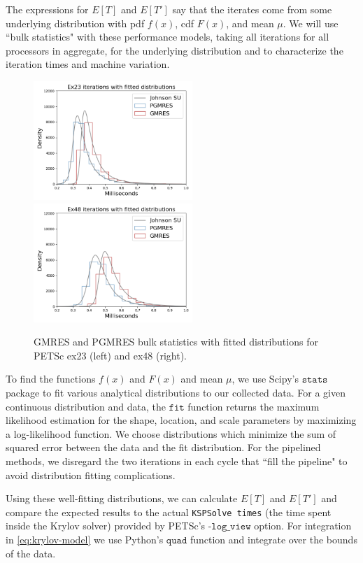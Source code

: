 \documentclass[sigconf]{acmart}
\begin{document}
The expressions for $E[T]$ and $E[T']$ say that the iterates come from some underlying  distribution with pdf $f(x)$, cdf $F(x)$, and mean $\mu$. 
We will use ``bulk statistics" with these performance models, taking all iterations for all processors in aggregate, for the underlying distribution and to characterize the iteration times and machine variation. 

\begin{figure}[b]
\centering
\includegraphics[width=6cm]{../plots/GMRES_PGMRES_ex23_8192_1000000_bulk_stats_with_johnsonsu.png}
\includegraphics[width=6cm]{../plots/GMRES_PGMRES_ex48_8192_1000000_bulk_stats_with_johnsonsu.png} 
\caption{GMRES and PGMRES bulk statistics with fitted distributions for PETSc ex23 (left) and ex48 (right).} \label{fig:bulk-fitted}
\end{figure}

To find the functions $f(x)$ and $F(x)$ and mean $\mu$, we use Scipy's ${\texttt{stats}}$ package to fit various analytical distributions to our collected data. For a given continuous distribution and data, the ${\texttt{fit}}$ function returns the maximum likelihood estimation for the shape, location, and scale parameters by maximizing a log-likelihood function.  
We choose distributions which minimize the sum of squared error between the data and the fit distribution.
For the pipelined methods, we disregard the two iterations in each cycle that ``fill the pipeline" to avoid distribution fitting complications.




Using these well-fitting distributions, we can calculate $E[T]$ and $E[T']$ and compare the expected results to the actual \texttt{KSPSolve times} (the time spent inside the Krylov solver) provided by PETSc's ${\texttt{-log\_view}}$ option. 
For integration in \eqref{eq:krylov-model} we use Python's ${\texttt{quad}}$ function and integrate over the bounds of the data.
\end{document}
